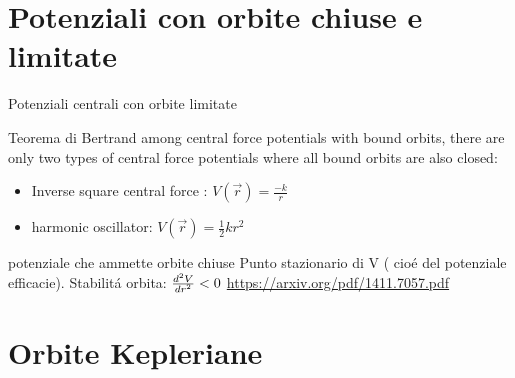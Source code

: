\section{Potenziali con orbite chiuse e limitate}
\begin{frame}{Potenziali centrali con orbite limitate}
\begin{block}{Teorema di Bertrand}
among central force potentials with bound orbits, there are only two types of central force potentials where all bound orbits are also closed:
\begin{itemize}
\item Inverse square central force : $V(\vec{r})=\frac{-k}{r}$
\item harmonic oscillator: $V(\vec{r})=\frac{1}{2}kr^2$
\end{itemize}
\end{block}
\end{frame}

\begin{wordonframe}{potenziale che ammette orbite chiuse}
Punto stazionario di V ( cio\'e del potenziale efficacie).
Stabilit\'a orbita: $\TtwoDy{r}{V}<0$
\url{https://arxiv.org/pdf/1411.7057.pdf}
\end{wordonframe}

\section{Orbite Kepleriane}

